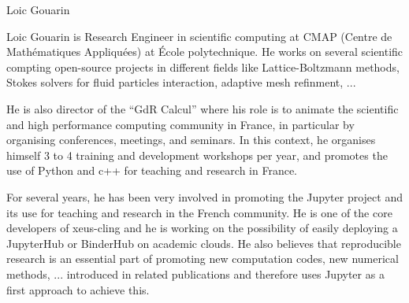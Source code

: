 \begin{participant}[type=R,PM=8,gender=male]{Loic Gouarin}

  Loic Gouarin is Research Engineer in scientific computing at CMAP (Centre de
  Mathématiques Appliquées) at \'Ecole polytechnique. He works on several
  scientific compting open-source projects in different fields like
  Lattice-Boltzmann methods, Stokes solvers for fluid particles interaction,
  adaptive mesh refinment, ...

  He is also director of the ``GdR Calcul'' where his role is to animate the
  scientific and high performance computing community in France, in particular
  by organising conferences, meetings, and seminars. In this context, he
  organises himself 3 to 4 training and development workshops per year, and
  promotes the use of Python and c++ for teaching and research in France.
  
  For several years, he has been very involved in promoting the Jupyter project
  and its use for teaching and research in the French community. He is one of
  the core developers of xeus-cling and he is working on the possibility of
  easily deploying a JupyterHub or BinderHub on academic clouds. He also
  believes that reproducible research is an essential part of promoting new
  computation codes, new numerical methods, ... introduced in related
  publications and therefore uses Jupyter as a first approach to achieve this.
  
  \end{participant}
  
  